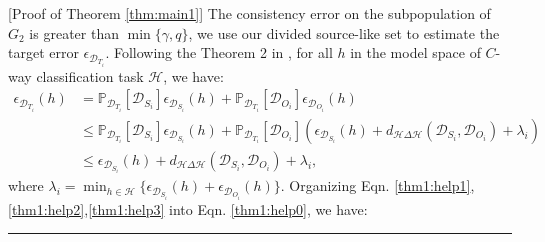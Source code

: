 \documentclass{article}
\newcommand{\BlackBox}{\rule{1.5ex}{1.5ex}}  \fi
\newenvironment{proof}{\par\noindent{\em Proof:\ }}{\hfill\BlackBox\\[.0mm]}
\begin{document}
\begin{proof}[Proof of Theorem \ref{thm:main1}]
The consistency error on the subpopulation of $G_2$ is greater than $\min{\{\gamma,q\}}$, we use our divided source-like set to estimate the target error $\epsilon_{\mathcal{D}_{T_i}}$. Following the Theorem 2 in \cite{ben2010theory}, for all $h$ in the model space of $C$-way classification task $\mathcal{H}$, we have:
\begin{equation}\label{thm1:help3}
\begin{aligned}
    \epsilon_{\mathcal{D}_{T_i}}(h) &= \mathbb{P}_{\mathcal{D}_{T_i}}[\mathcal{D}_{S_i}] \epsilon_{\mathcal{D}_{S_i}}(h) + \mathbb{P}_{\mathcal{D}_{T_i}}[\mathcal{D}_{O_i}]\epsilon_{\mathcal{D}_{O_i}}(h)\\
    &\leq 
    \mathbb{P}_{\mathcal{D}_{T_i}}[\mathcal{D}_{S_i}] \epsilon_{\mathcal{D}_{S_i}}(h)
    +\mathbb{P}_{\mathcal{D}_{T_i}}[\mathcal{D}_{O_i}]
    \left(
    \epsilon_{\mathcal{D}_{S_i}}(h)+ d_{\mathcal{H}\Delta\mathcal{H}}(\mathcal{D}_{S_i},\mathcal{D}_{O_i})
    +\lambda_i
    \right) \\
    &\leq \epsilon_{\mathcal{D}_{S_i}}(h) +d_{\mathcal{H}\Delta\mathcal{H}}(\mathcal{D}_{S_i},\mathcal{D}_{O_i})
    +\lambda_i,
\end{aligned}
\end{equation}
where $\lambda_i = \min_{h\in\mathcal{H}} \{ \epsilon_{\mathcal{D}_{S_i}}(h)+ \epsilon_{\mathcal{D}_{O_i}}(h)\}$.
Organizing Eqn. \ref{thm1:help1},\ref{thm1:help2},\ref{thm1:help3} into Eqn. \ref{thm1:help0}, we have:


\end{proof}
\end{document}

